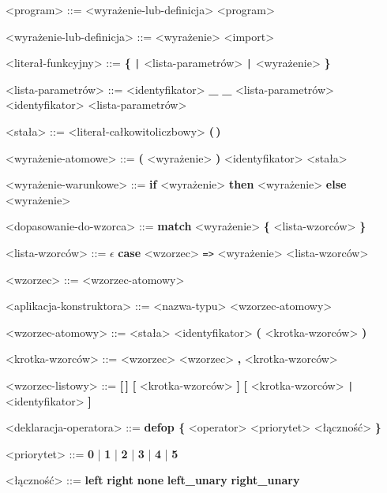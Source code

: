 \documentclass[12pt]{article}
\begin{document}
\begin{grammar}

<program> ::=
    <wyrażenie-lub-definicja>
     <program>

<wyrażenie-lub-definicja> ::=
    <wyrażenie>
    \alt <import>

<literał-funkcyjny> ::=
    \textbf{\{} \texttt{|} <lista-parametrów> \texttt{|} <wyrażenie> \textbf{\}}

<lista-parametrów> ::=
    <identyfikator>
    \alt \textbf{_}
    \alt \textbf{_} <lista-parametrów>
    \alt <identyfikator> <lista-parametrów>

<stała> ::=
    <literał-całkowitoliczbowy>
    \alt \textbf{(\,)}

<wyrażenie-atomowe> ::=
    \textbf{(} <wyrażenie> \textbf{)}
    \alt <identyfikator>
    \alt <stała>

<wyrażenie-warunkowe> ::=
    \textbf{if} <wyrażenie>
    \textbf{then} <wyrażenie>
    \textbf{else} <wyrażenie>

<dopasowanie-do-wzorca> ::=
    \textbf{match} <wyrażenie> \textbf{\{}
    <lista-wzorców> \textbf{\}}

<lista-wzorców> ::= $\epsilon$
    \alt \textbf{case} <wzorzec> \texttt{=>} <wyrażenie> <lista-wzorców>

<wzorzec> ::=
    <wzorzec-atomowy>

<aplikacja-konstruktora> ::=
    <nazwa-typu> <wzorzec-atomowy>

<wzorzec-atomowy> ::=
    <stała>
    \alt <identyfikator>
    \alt \textbf{(} <krotka-wzorców> \textbf{)}

<krotka-wzorców> ::=
    <wzorzec>
    \alt <wzorzec> \textbf{,} <krotka-wzorców>

<wzorzec-listowy> ::=
    \textbf{[\,]}
    \alt \textbf{[} <krotka-wzorców> \textbf{]}
    \alt \textbf{[} <krotka-wzorców> \texttt{|} <identyfikator> \textbf{]}

<deklaracja-operatora> ::=
    \textbf{defop \{} <operator> <priorytet> <łączność> \textbf{\}}

<priorytet> ::=
    \textbf{0} | \textbf{1} | \textbf{2} | \textbf{3} | \textbf{4} | \textbf{5}

<łączność> ::=
    \textbf{left}
    \alt \textbf{right}
    \alt \textbf{none}
    \alt \textbf{left_unary}
    \alt \textbf{right_unary}


\end{grammar}
\end{document}
